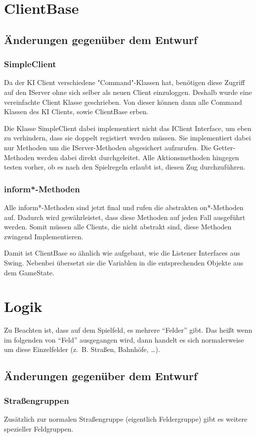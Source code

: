 \documentclass[a4paper,10pt]{article}
\begin{document}
\section{ClientBase}
\subsection {Änderungen gegenüber dem Entwurf}
\subsubsection{SimpleClient}
Da der KI Client verschiedene "Command"-Klassen hat, benötigen diese Zugriff auf den IServer ohne sich selber als neuen Client einzuloggen. Deshalb wurde eine vereinfachte Client Klasse geschrieben. Von dieser können dann alle Command Klassen des KI Clients, sowie ClientBase erben.

Die Klasse SimpleClient dabei implementiert nicht das IClient Interface, um eben zu verhindern, dass sie doppelt registiert werden müssen. Sie implementiert dabei nur Methoden um die IServer-Methoden abgesichert aufzurufen. Die Getter-Methoden werden dabei direkt durchgeleitet. Alle Aktionsmethoden hingegen testen vorher, ob es nach den Spielregeln erlaubt ist, diesen Zug durchzuführen.
\subsubsection{inform*-Methoden}
Alle inform*-Methoden sind jetzt final und rufen die abstrakten on*-Methoden auf. Dadurch wird gewährleistet, dass diese Methoden auf jeden Fall ausgeführt werden. Somit müssen alle Clients, die nicht abstrakt sind, diese Methoden zwingend Implementieren.

Damit ist ClientBase so ähnlich wie aufgebaut, wie die Listener Interfaces aus Swing. Nebenbei übersetzt sie die Variablen in die entsprechenden Objekte aus dem GameState.

\section{Logik}
Zu Beachten ist, dass auf dem Spielfeld, es mehrere ``Felder'' gibt. Das heißt wenn im folgenden von ``Feld'' ausgegangen wird, dann handelt es sich normalerweise um diese Einzelfelder (z.~B. Straßen, Bahnhöfe, \dots).
\subsection {Änderungen gegenüber dem Entwurf}
\subsubsection{Straßengruppen}
Zusätzlich zur normalen Straßengruppe (eigentlich Feldergruppe) gibt es weitere spezieller Feldgruppen.
\end{document}
